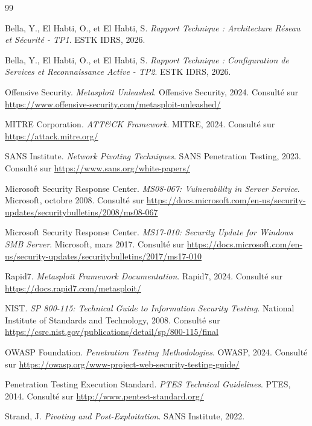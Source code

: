 \documentclass[12pt,a4paper,openany]{report}
\begin{document}
	\begin{thebibliography}{99}
		
		Bella, Y., El Habti, O., et El Habti, S. \textit{Rapport Technique : Architecture Réseau et Sécurité - TP1}. ESTK IDRS, 2026.
		
		Bella, Y., El Habti, O., et El Habti, S. \textit{Rapport Technique : Configuration de Services et Reconnaissance Active - TP2}. ESTK IDRS, 2026.
		
		Offensive Security. \textit{Metasploit Unleashed}. Offensive Security, 2024. Consulté sur \url{https://www.offensive-security.com/metasploit-unleashed/}
		
		MITRE Corporation. \textit{ATT\&CK Framework}. MITRE, 2024. Consulté sur \url{https://attack.mitre.org/}
		
		SANS Institute. \textit{Network Pivoting Techniques}. SANS Penetration Testing, 2023. Consulté sur \url{https://www.sans.org/white-papers/}
		
		Microsoft Security Response Center. \textit{MS08-067: Vulnerability in Server Service}. Microsoft, octobre 2008. Consulté sur \url{https://docs.microsoft.com/en-us/security-updates/securitybulletins/2008/ms08-067}
		
		Microsoft Security Response Center. \textit{MS17-010: Security Update for Windows SMB Server}. Microsoft, mars 2017. Consulté sur \url{https://docs.microsoft.com/en-us/security-updates/securitybulletins/2017/ms17-010}
		
		Rapid7. \textit{Metasploit Framework Documentation}. Rapid7, 2024. Consulté sur \url{https://docs.rapid7.com/metasploit/}
		
		NIST. \textit{SP 800-115: Technical Guide to Information Security Testing}. National Institute of Standards and Technology, 2008. Consulté sur \url{https://csrc.nist.gov/publications/detail/sp/800-115/final}
		
		OWASP Foundation. \textit{Penetration Testing Methodologies}. OWASP, 2024. Consulté sur \url{https://owasp.org/www-project-web-security-testing-guide/}
		
		Penetration Testing Execution Standard. \textit{PTES Technical Guidelines}. PTES, 2014. Consulté sur \url{http://www.pentest-standard.org/}
		
		Strand, J. \textit{Pivoting and Post-Exploitation}. SANS Institute, 2022.
		
	\end{thebibliography}
	
\end{document}
